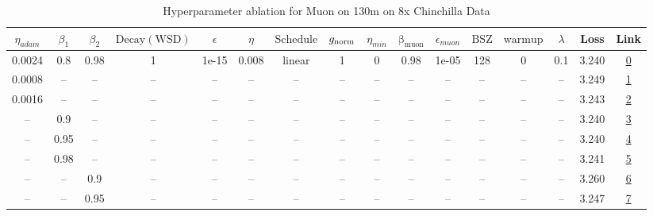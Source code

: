\begin{table}[H]
\centering
\caption{Hyperparameter ablation for Muon on 130m on 8x Chinchilla Data}
\label{tab:ablation_muon_130m_on_8x_chinchilla_data}
\begin{tabular}{cccccccccccccccc}
\toprule
$\eta_{adam}$ & $\beta_1$ & $\beta_2$ & $\mathrm{Decay (WSD)}$ & $\epsilon$ & $\eta$ & $\mathrm{Schedule}$ & $g_{\mathrm{norm}}$ & $\eta_{min}$ & $\mathrm{\beta_{muon}}$ & $\epsilon_{muon}$ & $\mathrm{BSZ}$ & $\mathrm{warmup}$ & $\lambda$ & Loss & Link \\
\midrule
0.0024 & 0.8 & 0.98 & 1 & 1e-15 & 0.008 & linear & 1 & 0 & 0.98 & 1e-05 & 128 & 0 & 0.1 & 3.240 & \href{https://wandb.ai/marin-community/optimizer-scaling/runs/sweep-130m-21B-muon9841d7lr0.008-wd0.1-minlr0-warmup0-b10.8-b20.-6269f2}{0} \\
\midrule
0.0008 & -- & -- & -- & -- & -- & -- & -- & -- & -- & -- & -- & -- & -- & 3.249 & \href{https://wandb.ai/marin-community/optimizer-scaling/runs/sweep-130m-21B-muondf893alr0.008-wd0.1-minlr0-warmup0-b10.8-b20.-9ec54b}{1} \\
0.0016 & -- & -- & -- & -- & -- & -- & -- & -- & -- & -- & -- & -- & -- & 3.243 & \href{https://wandb.ai/marin-community/optimizer-scaling/runs/sweep-130m-21B-muon5db4falr0.008-wd0.1-minlr0-warmup0-b10.8-b20.-642691}{2} \\
-- & 0.9 & -- & -- & -- & -- & -- & -- & -- & -- & -- & -- & -- & -- & 3.240 & \href{https://wandb.ai/marin-community/optimizer-scaling/runs/sweep-130m-21B-muon84cfa5lr0.008-wd0.1-minlr0-warmup0-b10.9-b20.-e91d3e}{3} \\
-- & 0.95 & -- & -- & -- & -- & -- & -- & -- & -- & -- & -- & -- & -- & 3.240 & \href{https://wandb.ai/marin-community/optimizer-scaling/runs/sweep-130m-21B-muon0df321lr0.008-wd0.1-minlr0-warmup0-b10.95-b20-df585f}{4} \\
-- & 0.98 & -- & -- & -- & -- & -- & -- & -- & -- & -- & -- & -- & -- & 3.241 & \href{https://wandb.ai/marin-community/optimizer-scaling/runs/sweep-130m-21B-muonfd2768lr0.008-wd0.1-minlr0-warmup0-b10.98-b20-ee9b19}{5} \\
-- & -- & 0.9 & -- & -- & -- & -- & -- & -- & -- & -- & -- & -- & -- & 3.260 & \href{https://wandb.ai/marin-community/optimizer-scaling/runs/sweep-130m-21B-muon6d8811lr0.008-wd0.1-minlr0-warmup0-b10.8-b20.-2cfe0a}{6} \\
-- & -- & 0.95 & -- & -- & -- & -- & -- & -- & -- & -- & -- & -- & -- & 3.247 & \href{https://wandb.ai/marin-community/optimizer-scaling/runs/sweep-130m-21B-muon8b9bb9lr0.008-wd0.1-minlr0-warmup0-b10.8-b20.-74bf2d}{7} \\

\end{tabular}
\end{table}
